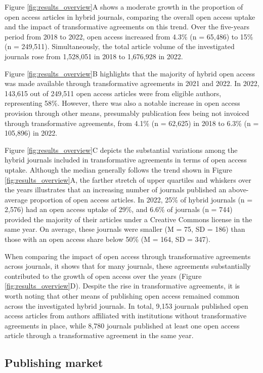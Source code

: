 \documentclass[a4paper,man,floatsintext,longtable,noextraspace,12pt]{apa6}
\begin{document}
Figure \ref{fig:results_overview}A shows a moderate growth in the
proportion of open access articles in hybrid journals, comparing the
overall open access uptake and the impact of transformative agreements
on this trend. Over the five-years period from 2018 to 2022, open access
increased from 4.3\% (n = 65,486) to 15\% (n = 249,511). Simultaneously,
the total article volume of the investigated journals rose from
1,528,051 in 2018 to 1,676,928 in 2022.

Figure \ref{fig:results_overview}B highlights that the majority of
hybrid open access was made available through transformative agreements
in 2021 and 2022. In 2022, 143,615 out of 249,511 open access articles
were from eligible authors, representing 58\%. However, there was also a
notable increase in open access provision through other means,
presumably publication fees being not invoiced through transformative
agreements, from 4.1\% (n = 62,625) in 2018 to 6.3\% (n = 105,896) in
2022.

Figure \ref{fig:results_overview}C depicts the substantial variations
among the hybrid journals included in transformative agreements in terms
of open access uptake. Although the median generally follows the trend
shown in Figure \ref{fig:results_overview}A, the farther stretch of
upper quartiles and whiskers over the years illustrates that an
increasing number of journals published an above-average proportion of
open access articles. In 2022, 25\% of hybrid journals (n = 2,576) had
an open access uptake of 29\%, and 6.6\% of journals (n = 744) provided
the majority of their articles under a Creative Commons license in the
same year. On average, these journals were smaller (M = 75, SD = 186)
than those with an open access share below 50\% (M = 164, SD = 347).

When comparing the impact of open access through transformative
agreements across journals, it shows that for many journals, these
agreements substantially contributed to the growth of open access over
the years (Figure \ref{fig:results_overview}D). Despite the rise in
transformative agreements, it is worth noting that other means of
publishing open access remained common across the investigated hybrid
journals. In total, 9,153 journals published open access articles from
authors affiliated with institutions without transformative agreements
in place, while 8,780 journals published at least one open access
article through a transformative agreement in the same year.

\hypertarget{publishing-market}{%
\subsection{Publishing market}\label{publishing-market}}
\end{document}
